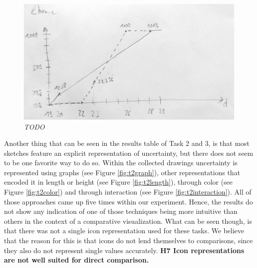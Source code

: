 \begin{figure}[H]
	\centering
	\captionsetup{width=0.8\textwidth}
	\includegraphics[height=0.45\textwidth]{figures/compgraph.jpg}
	\caption{\textit{TODO}}
	\label{fig:compgraph}
\end{figure}

Another thing that can be seen in the results table of Task 2 and 3, is that most sketches feature an explicit representation of uncertainty, but there does not seem to be one favorite way to do so. Within the collected drawings uncertainty is represented using graphs (see Figure \ref{fig:t2graph}), other representations that encoded it in length or height (see Figure \ref{fig:t2length}), through color (see Figure \ref{fig:t2color}) and through interaction (see Figure \ref{fig:t2interaction}). All of those approaches came up five times within our experiment. Hence, the results do not show any indication of one of those techniques being more intuitive than others in the context of a comparative visualization. What can be seen though, is that there was not a single icon representation used for these tasks. We believe that the reason for this is that icons do not lend themselves to comparisons, since they also do not represent single values accurately. \textbf{H7 Icon representations are not well suited for direct comparison.} \par \medskip


